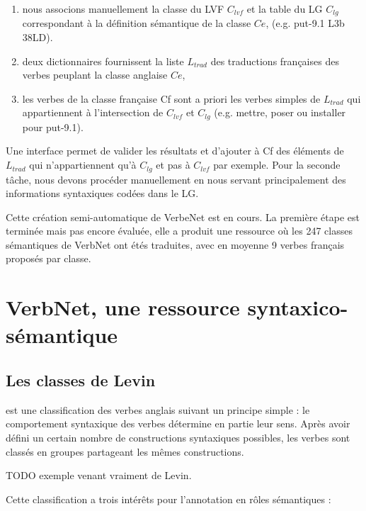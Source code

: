 \begin{enumerate}

    \item nous associons manuellement la classe du LVF $C_{lvf}$ et la table du
        LG $C_{lg}$ correspondant à la définition sémantique de la classe $Ce$,
        (e.g. put-9.1 L3b 38LD).

    \item deux dictionnaires fournissent la liste $L_{trad}$ des traductions
        françaises des verbes peuplant la classe anglaise $Ce$, 

    \item les verbes de la classe française Cf sont a priori les verbes simples
        de $L_{trad}$ qui appartiennent à l'intersection de $C_{lvf}$ et
        $C_{lg}$ (e.g. mettre, poser ou installer pour put-9.1).

\end{enumerate}

Une interface permet de valider les résultats et d'ajouter à Cf des éléments de
$L_{trad}$ qui n'appartiennent qu'à $C_{lg}$ et pas à $C_{lvf}$ par exemple.
Pour la seconde tâche, nous devons procéder manuellement en nous servant
principalement des informations syntaxiques codées dans le LG.

Cette création semi-automatique de VerbeNet est en cours. La première étape est
terminée mais pas encore évaluée, elle a produit une ressource où les 247
classes sémantiques de VerbNet ont étés traduites, avec en moyenne 9 verbes
français proposés par classe.

\section{VerbNet, une ressource syntaxico-sémantique}
\label{ch:verbnet:sec:verbnet}

\subsection{Les classes de Levin}

\cite{levin1993english} est une classification des verbes anglais suivant un
principe simple : le comportement syntaxique des verbes détermine en partie
leur sens. Après avoir défini un certain nombre de constructions syntaxiques
possibles, les verbes sont classés en groupes partageant les mêmes
constructions.

TODO exemple venant vraiment de Levin.

Cette classification a trois intérêts pour l'annotation en rôles sémantiques :

